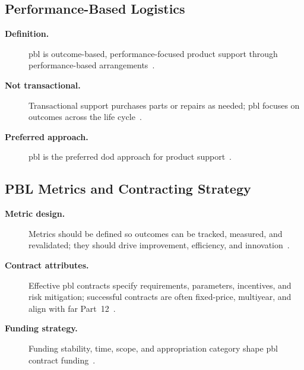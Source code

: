 \documentclass[../main.tex]{subfiles}
\begin{document}
\subsection{Performance-Based Logistics}
\begin{description}
  \item[\textbf{Definition.}] \ac{pbl} is outcome-based, performance-focused product support through performance-based arrangements~\autocite{edo-3-5-4-acquisition-logistics-2025}.
  \item[\textbf{Not transactional.}] Transactional support purchases parts or repairs as needed; \ac{pbl} focuses on outcomes across the life cycle~\autocite{edo-3-5-4-acquisition-logistics-2025}.
  \item[\textbf{Preferred approach.}] \ac{pbl} is the preferred \ac{dod} approach for product support~\autocite{edo-3-5-4-acquisition-logistics-2025}.
\end{description}

\subsection{PBL Metrics and Contracting Strategy}
\begin{description}
  \item[\textbf{Metric design.}] Metrics should be defined so outcomes can be tracked, measured, and revalidated; they should drive improvement, efficiency, and innovation~\autocite{edo-3-5-4-acquisition-logistics-2025}.
  \item[\textbf{Contract attributes.}] Effective \ac{pbl} contracts specify requirements, parameters, incentives, and risk mitigation; successful contracts are often fixed-price, multiyear, and align with \ac{far} Part~12~\autocite{edo-3-5-4-acquisition-logistics-2025}.
  \item[\textbf{Funding strategy.}] Funding stability, time, scope, and appropriation category shape \ac{pbl} contract funding~\autocite{edo-3-5-4-acquisition-logistics-2025}.
\end{description}
\end{document}

